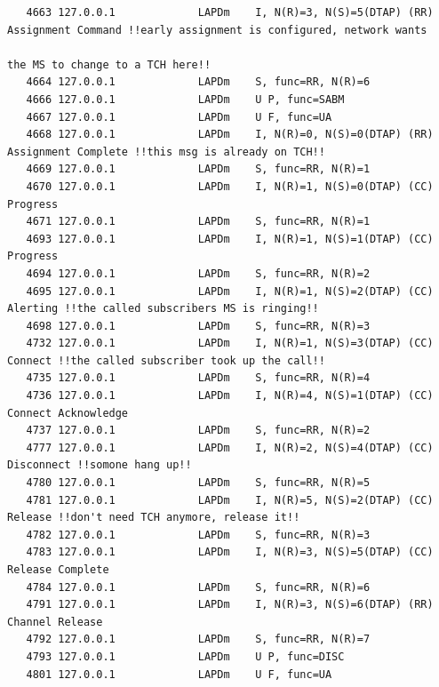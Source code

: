 \begin{lstlisting}
   4663 127.0.0.1             LAPDm    I, N(R)=3, N(S)=5(DTAP) (RR) Assignment Command !!early assignment is configured, network wants
                                                                                       the MS to change to a TCH here!!
   4664 127.0.0.1             LAPDm    S, func=RR, N(R)=6
   4666 127.0.0.1             LAPDm    U P, func=SABM
   4667 127.0.0.1             LAPDm    U F, func=UA
   4668 127.0.0.1             LAPDm    I, N(R)=0, N(S)=0(DTAP) (RR) Assignment Complete !!this msg is already on TCH!!
   4669 127.0.0.1             LAPDm    S, func=RR, N(R)=1
   4670 127.0.0.1             LAPDm    I, N(R)=1, N(S)=0(DTAP) (CC) Progress 
   4671 127.0.0.1             LAPDm    S, func=RR, N(R)=1
   4693 127.0.0.1             LAPDm    I, N(R)=1, N(S)=1(DTAP) (CC) Progress 
   4694 127.0.0.1             LAPDm    S, func=RR, N(R)=2
   4695 127.0.0.1             LAPDm    I, N(R)=1, N(S)=2(DTAP) (CC) Alerting !!the called subscribers MS is ringing!!
   4698 127.0.0.1             LAPDm    S, func=RR, N(R)=3
   4732 127.0.0.1             LAPDm    I, N(R)=1, N(S)=3(DTAP) (CC) Connect !!the called subscriber took up the call!!
   4735 127.0.0.1             LAPDm    S, func=RR, N(R)=4
   4736 127.0.0.1             LAPDm    I, N(R)=4, N(S)=1(DTAP) (CC) Connect Acknowledge 
   4737 127.0.0.1             LAPDm    S, func=RR, N(R)=2
   4777 127.0.0.1             LAPDm    I, N(R)=2, N(S)=4(DTAP) (CC) Disconnect !!somone hang up!!
   4780 127.0.0.1             LAPDm    S, func=RR, N(R)=5
   4781 127.0.0.1             LAPDm    I, N(R)=5, N(S)=2(DTAP) (CC) Release !!don't need TCH anymore, release it!!
   4782 127.0.0.1             LAPDm    S, func=RR, N(R)=3
   4783 127.0.0.1             LAPDm    I, N(R)=3, N(S)=5(DTAP) (CC) Release Complete 
   4784 127.0.0.1             LAPDm    S, func=RR, N(R)=6
   4791 127.0.0.1             LAPDm    I, N(R)=3, N(S)=6(DTAP) (RR) Channel Release 
   4792 127.0.0.1             LAPDm    S, func=RR, N(R)=7
   4793 127.0.0.1             LAPDm    U P, func=DISC
   4801 127.0.0.1             LAPDm    U F, func=UA
\end{lstlisting}

